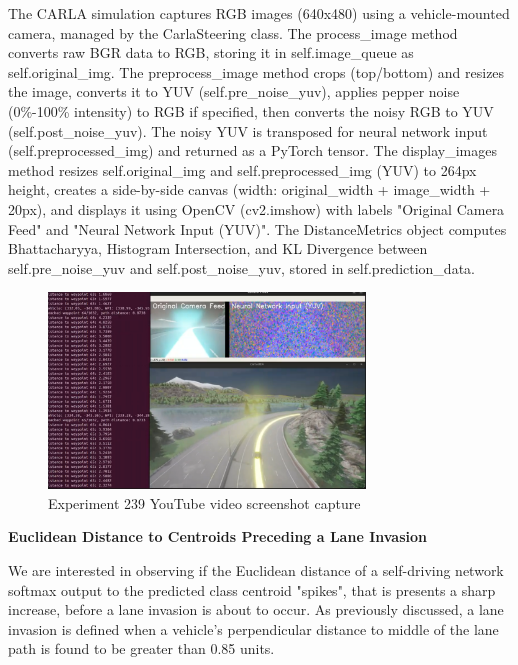 The CARLA simulation captures RGB images (640x480) using a vehicle-mounted camera, managed by the CarlaSteering class. The process\_image method converts raw BGR data to RGB, storing it in self.image\_queue as self.original\_img. The preprocess\_image method crops (top/bottom) and resizes the image, converts it to YUV (self.pre\_noise\_yuv), applies pepper noise (0\%-100\% intensity) to RGB if specified, then converts the noisy RGB to YUV (self.post\_noise\_yuv). The noisy YUV is transposed for neural network input (self.preprocessed\_img) and returned as a PyTorch tensor. The display\_images method resizes self.original\_img and self.preprocessed\_img (YUV) to 264px height, creates a side-by-side canvas (width: original\_width + image\_width + 20px), and displays it using OpenCV (cv2.imshow) with labels "Original Camera Feed" and "Neural Network Input (YUV)". The DistanceMetrics object computes Bhattacharyya, Histogram Intersection, and KL Divergence between self.pre\_noise\_yuv and self.post\_noise\_yuv, stored in self.prediction\_data.

\begin{figure}[h]
    \centering
    \includegraphics[width=0.75\textwidth]{Figures/Results/Exp239-30pc-noise-CNN-5-bin-bal-youtube.png}
    \caption{Experiment 239 YouTube video screenshot capture}
    \label{fig:Exp239-30pc-noise-CNN-5-bin-bal-youtube}
\end{figure}


\textbf{Euclidean Distance to Centroids Preceding a Lane Invasion}
\label{res:ed_centroids_preceding_lane_invasion}

We are interested in observing if the Euclidean distance of a self-driving network softmax output to the predicted class centroid "spikes", that is presents a sharp increase, before a lane invasion is about to occur. As previously discussed, a lane invasion is defined when a vehicle's perpendicular distance to middle of the lane path is found to be greater than 0.85 units. 

